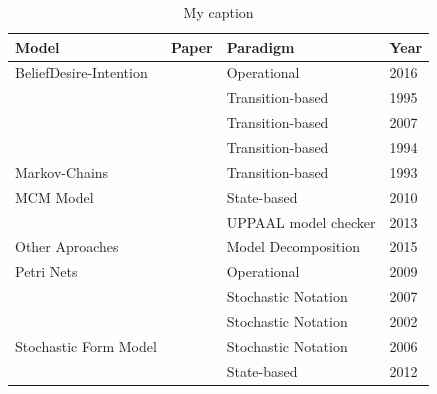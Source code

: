 \documentclass{report}
\begin{document}
\begin{table}[!h]
\centering
\caption{My caption}
\label{modelsummary}
\begin{tabular}{|l|l|l|l|}
\hline
\rowcolor[HTML]{C0C0C0}
\textbf{Model}                          & \textbf{Paper}          & \textbf{Paradigm}    & \textbf{Year} \\ \hline
BeliefDesire-Intention                  & \cite{Araiza-Illan2016} & Operational          & 2016          \\ \hline
                                        & \cite{Avritzer1995b}    & Transition-based     & 1995          \\ \cline{2-4}
                                        & \cite{Barros2007}       & Transition-based     & 2007          \\ \cline{2-4}
                                        & \cite{Avritzer1994}     & Transition-based     & 1994          \\ \cline{2-4}
\multirow{-4}{*}{Markov-Chains}         & \cite{Avritzer1993}     & Transition-based     & 1993          \\ \hline
MCM Model                               & \cite{Wieczorek2010}    & State-based          & 2010          \\ \hline
                                        & \cite{Enoiu2013}        & UPPAAL model checker & 2013          \\ \cline{2-4}
\multirow{-2}{*}{Other Aproaches}       & \cite{Arcaini2015}      & Model Decomposition  & 2015          \\ \hline
Petri Nets                              & \cite{Buchs2009}        & Operational          & 2009          \\ \hline
                                        & \cite{Cai2007}          & Stochastic Notation    & 2007          \\ \cline{2-4}
                                                                                & \cite{Menasce2002a}          & Stochastic Notation    & 2002          \\ \cline{2-4}
\multirow{-3}{*}{Stochastic Form Model} & \cite{Draheim2006b}     & Stochastic Notation     & 2006          \\ \hline
                                        & \cite{Fang2012}         & State-based          & 2012          \\ \cline{2-4}

\end{tabular}
\end{table}
\end{document}
